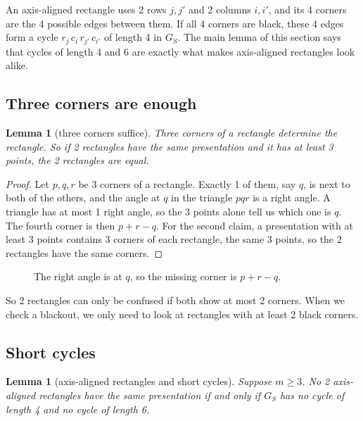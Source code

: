 \documentclass[11pt]{article}
\newtheorem{lemma}[theorem]{Lemma}
\theoremstyle{definition}
\theoremstyle{remark}
\begin{document}
An axis-aligned rectangle uses 2 rows $j,j'$ and 2 columns $i,i'$, and its 4 corners are the 4
possible edges between them. If all 4 corners are black, these 4 edges form a cycle
$r_j\,c_i\,r_{j'}\,c_{i'}$ of length 4 in $G_S$. The main lemma of this section says that cycles
of length 4 and 6 are exactly what makes axis-aligned rectangles look alike.

\subsection{Three corners are enough}

\begin{lemma}[three corners suffice]\label{lem:threecorners}
Three corners of a rectangle determine the rectangle. So if 2 rectangles have the same
presentation and it has at least 3 points, the 2 rectangles are equal.
\end{lemma}

\begin{proof}
Let $p,q,r$ be 3 corners of a rectangle. Exactly 1 of them, say $q$, is next to both of the
others, and the angle at $q$ in the triangle $pqr$ is a right angle. A triangle has at most 1
right angle, so the 3 points alone tell us which one is $q$. The fourth corner is then
$p+r-q$. For the second claim, a presentation with at least 3 points contains 3 corners of each
rectangle, the same 3 points, so the 2 rectangles have the same corners.
\end{proof}

\begin{figure}[htbp]
\centering

\caption{The right angle is at $q$, so the missing corner is $p+r-q$.}
\label{fig:threecorners}
\end{figure}

So 2 rectangles can only be confused if both show at most 2 corners. When we check a blackout,
we only need to look at rectangles with at least 2 black corners.

\subsection{Short cycles}

\begin{lemma}[axis-aligned rectangles and short cycles]\label{lem:girth}
Suppose $m\ge3$. No 2 axis-aligned rectangles have the same presentation if and only if $G_S$
has no cycle of length 4 and no cycle of length 6.
\end{lemma}
\end{document}
